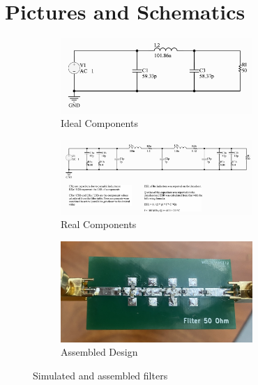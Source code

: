 \documentclass[letterpaper,12pt]{article}
\begin{document}
\newpage
\section{Pictures and Schematics\label{sec:pics_and_schematics}}
\begin{figure}[H]
    \begin{subfigure}[t]{1\textwidth}
        \centering
        \includegraphics[width=0.8\textwidth]{figures/2.ideal_components}
        \caption{Ideal Components}
    \end{subfigure}

    \medskip

    \begin{subfigure}[t]{1\textwidth}
        \centering
        \includegraphics[width=0.8\textwidth]{figures/2.real_components}
        \caption{Real Components}
    \end{subfigure}

    \medskip

    \begin{subfigure}[t]{1\textwidth}
        \centering
        \includegraphics[width=0.8\textwidth]{figures/2.assembled}
        \caption{Assembled Design}
    \end{subfigure}
    \vspace{0.5cm}
    \caption{Simulated and assembled filters}
\end{figure}
\end{document}
